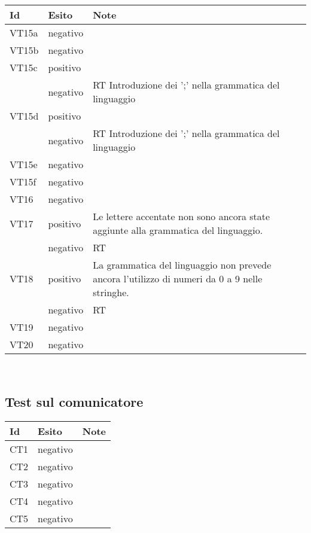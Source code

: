 \begin{center}
\begin{tabular}{|p{1cm}|p{1.6cm}|p{8.4cm}|} \hline
\textbf{Id} & \textbf{Esito} & \textbf{Note} \\ \hline
VT15a & negativo & \\ \hline
VT15b & negativo & \\ \hline
VT15c & \textcolor{err}{positivo} &  \\ \cline{2-3}
& \textcolor{rt}{negativo} & RT Introduzione dei ';' nella grammatica del linguaggio \\ \hline
VT15d & \textcolor{err}{positivo} & \\ \cline{2-3}
& \textcolor{rt}{negativo} & RT Introduzione dei ';' nella grammatica del linguaggio \\ \hline
VT15e & negativo & \\ \hline
VT15f & negativo & \\ \hline
VT16 & negativo & \\ \hline
VT17 & \textcolor{err}{positivo} & Le lettere accentate non sono ancora state aggiunte alla grammatica del linguaggio.\\ \cline{2-3}
& \textcolor{rt}{negativo} & RT  \\ \hline
VT18 & \textcolor{err}{positivo} & La grammatica del linguaggio non prevede ancora l'utilizzo di numeri da 0 a 9 nelle stringhe.\\ \cline{2-3}
& \textcolor{rt}{negativo} & RT  \\ \hline
VT19 & negativo & \\ \hline
VT20 & negativo & \\ \hline
\end{tabular} \\
\end{center}

\subsection{Test sul comunicatore}
\begin{center}
\begin{tabular}{|p{1cm}|p{1.6cm}|p{8.4cm}|} \hline
\textbf{Id} & \textbf{Esito} & \textbf{Note} \\ \hline
CT1 & negativo & \\ \hline
CT2 & negativo & \\ \hline
CT3 & negativo & \\ \hline
CT4 & negativo & \\ \hline
CT5 & negativo & \\ \hline
\end{tabular} \\
\end{center}

